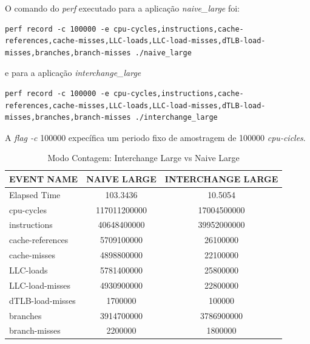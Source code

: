 \documentclass[conference,compsoc]{IEEEtran}
\begin{document}
O comando do \textit{perf} executado para a aplicação \textit{naive\_large} foi:

\begin{lstlisting}
perf record -c 100000 -e cpu-cycles,instructions,cache-references,cache-misses,LLC-loads,LLC-load-misses,dTLB-load-misses,branches,branch-misses ./naive_large
\end{lstlisting}

e para a aplicação \textit{interchange\_large}

\begin{lstlisting}
perf record -c 100000 -e cpu-cycles,instructions,cache-references,cache-misses,LLC-loads,LLC-load-misses,dTLB-load-misses,branches,branch-misses ./interchange_large
\end{lstlisting}

A \textit{flag -c} 100000 expecífica um periodo fixo de amostragem de 100000 \textit{cpu-cicles}.

\begin{table}[h!]
\centering
\begin{tabular}{|l|c|c|}
\hline
\multicolumn{1}{|c|}{\textbf{EVENT NAME}} & \textbf{NAIVE LARGE} & \textbf{INTERCHANGE LARGE} \\ \hline
Elapsed Time                              & 103.3436             & 10.5054                    \\ \hline
cpu-cycles                                & 117011200000         & 17004500000                \\ \hline
instructions                              & 40648400000          & 39952000000                \\ \hline
cache-references                          & 5709100000           & 26100000                   \\ \hline
cache-misses                              & 4898800000           & 22100000                   \\ \hline
LLC-loads                                 & 5781400000           & 25800000                   \\ \hline
LLC-load-misses                           & 4930900000           & 22800000                   \\ \hline
dTLB-load-misses                          & 1700000              & 100000                     \\ \hline
branches                                  & 3914700000           & 3786900000                 \\ \hline
branch-misses                             & 2200000              & 1800000                    \\ \hline
\end{tabular}
\caption{Modo Contagem: Interchange Large vs Naive Large}
\label{table:modo_contagem_contadores}
\end{table}
\end{document}

